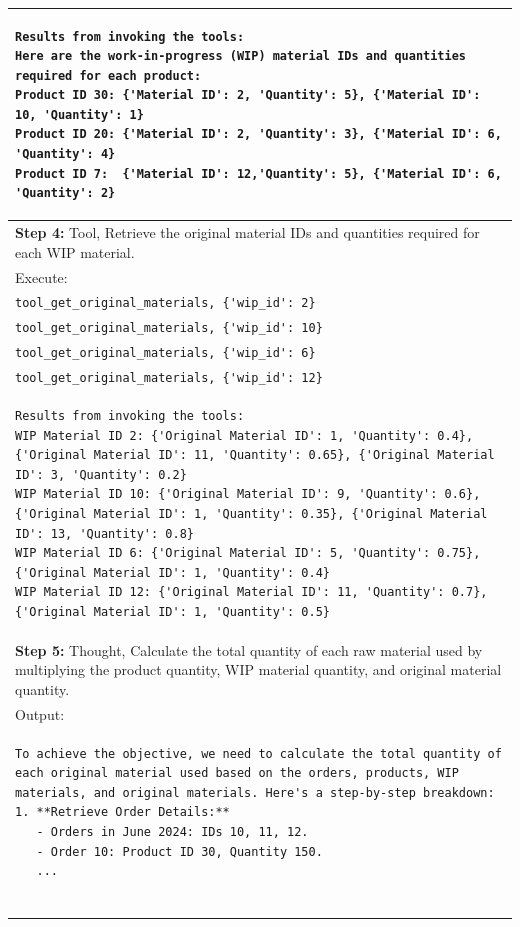 \documentclass[preprint,12pt]{elsarticle}
\begin{document}
\begin{center}
\begin{longtable}{p{390pt}}
\begin{lstlisting}[style=sql_command]
Results from invoking the tools:
Here are the work-in-progress (WIP) material IDs and quantities required for each product:
Product ID 30: {'Material ID': 2, 'Quantity': 5}, {'Material ID': 10, 'Quantity': 1}
Product ID 20: {'Material ID': 2, 'Quantity': 3}, {'Material ID': 6, 'Quantity': 4}
Product ID 7:  {'Material ID': 12,'Quantity': 5}, {'Material ID': 6, 'Quantity': 2}
\end{lstlisting}\\ \hline
\textbf{Step 4:} Tool, Retrieve the original material IDs and quantities required for each WIP material.\\
Execute:\\
\lstinline!tool_get_original_materials, {'wip_id': 2}! \\
\lstinline!tool_get_original_materials, {'wip_id': 10}! \\
\lstinline!tool_get_original_materials, {'wip_id': 6}! \\
\lstinline!tool_get_original_materials, {'wip_id': 12}!\\

\begin{lstlisting}[style=sql_command]
Results from invoking the tools:
WIP Material ID 2: {'Original Material ID': 1, 'Quantity': 0.4}, {'Original Material ID': 11, 'Quantity': 0.65}, {'Original Material ID': 3, 'Quantity': 0.2}
WIP Material ID 10: {'Original Material ID': 9, 'Quantity': 0.6}, {'Original Material ID': 1, 'Quantity': 0.35}, {'Original Material ID': 13, 'Quantity': 0.8}
WIP Material ID 6: {'Original Material ID': 5, 'Quantity': 0.75}, {'Original Material ID': 1, 'Quantity': 0.4}
WIP Material ID 12: {'Original Material ID': 11, 'Quantity': 0.7}, {'Original Material ID': 1, 'Quantity': 0.5}
\end{lstlisting}\\ \hline
\textbf{Step 5:} Thought, Calculate the total quantity of each raw material used by multiplying the product quantity, WIP material quantity, and original material quantity.\\
Output:\\
\begin{lstlisting}[style=sql_command]
To achieve the objective, we need to calculate the total quantity of each original material used based on the orders, products, WIP materials, and original materials. Here's a step-by-step breakdown:
1. **Retrieve Order Details:**
   - Orders in June 2024: IDs 10, 11, 12.
   - Order 10: Product ID 30, Quantity 150.
   ...
   

\end{lstlisting}
\end{longtable}
\end{center}
\end{document}
